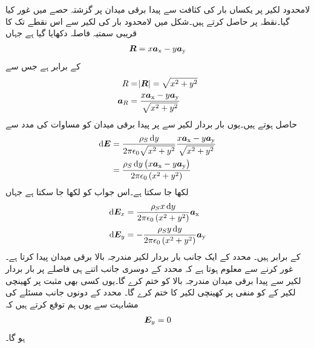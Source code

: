 لامحدود لکیر پر یکساں بار کی کثافت سے پیدا برقی میدان پر گزشتہ حصے میں غور کیا گیا۔نقطہ   پر  حاصل کرتے ہیں۔شکل میں لامحدود بار کی لکیر سے اس نقطے تک کا قریبی سمتیہ فاصلہ  دکھایا گیا ہے جہاں
\begin{align}
{\ensuremath{{\boldsymbol{R}}}}=x {\boldsymbol{a}}_{\textup{x}}-y{\boldsymbol{a}}_{\textup{y}}
\end{align}
کے برابر ہے جس سے
\begin{gather}
\begin{aligned}
R&=\abs{{{\boldsymbol{R}}}}=\sqrt{x^2+y^2}\\
{{\boldsymbol{a}}}_R&=\frac{x{\boldsymbol{a}}_{\textup{x}}-y{\boldsymbol{a}}_{\textup{y}}}{\sqrt{x^2+y^2}}
\end{aligned}
\end{gather}
حاصل ہوتے ہیں۔یوں بار بردار لکیر سے  پر پیدا برقی میدان کو مساوات   کی مدد سے
\begin{gather}
\begin{aligned}
\dif \kvec{E} &= \frac{\rho_S \dif y}{2 \pi \epsilon_0 \sqrt{x^2+y^2}} \frac{x\ax-y\ay}{\sqrt{x^2+y^2}}\\
&=\frac{\rho_S \dif y \left(x\ax-y\ay \right)}{2 \pi \epsilon_0 \left(x^2+y^2\right)}
\end{aligned}
\end{gather}
لکھا جا سکتا ہے۔اس جواب کو  لکھا جا سکتا ہے جہاں
\begin{gather}\label{مساوات_کولمب_لامحدود_سطح_کی_میدان_کے_اجزاء}
\begin{aligned}
\dif \kvec{E}_x&=\frac{\rho_S x \dif y }{2 \pi \epsilon_0 \left(x^2+y^2\right)}\ax\\
\dif \kvec{E}_y&=-\frac{\rho_S y\dif y }{2 \pi \epsilon_0 \left(x^2+y^2\right)} \ay
\end{aligned}
\end{gather}
کے برابر ہیں۔ محدد کے ایک جانب بار بردار لکیر مندرجہ بالا برقی میدان پیدا کرتا ہے۔غور کرنے سے معلوم ہوتا ہے کہ  محدد کے دوسری جانب اتنے ہی فاصلے پر بار بردار لکیر سے پیدا برقی میدان مندرجہ بالا  کو ختم کرے گا۔یوں کسی بھی مثبت  پر کھینچی لکیر کے   کو منفی  پر کھینچی لکیر کا  ختم کرے گا۔ محدد کے دونوں جانب مسئلے کی مشابہت سے یوں ہم توقع کرتے ہیں کہ
\begin{align}\label{مساوات_کولمب_سطحی_صفر_شدت_حصہ}
{\ensuremath{{\boldsymbol{E}}}}_y=0
\end{align} 
ہو گا۔

